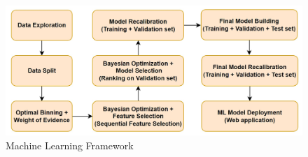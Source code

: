 \begin{figure}[H]
\centering
\caption{Machine Learning Framework}\vspace{0.5em}
\label{fig:mlframe}
\includegraphics[width=140mm]{Figures/ml_framework.jpg}

\vspace{-1em}
\end{figure}

\newpage
